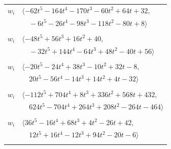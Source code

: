 \documentclass[11pt]{article}
\begin{document}
\begin{longtable}{@{}ll@{}}
$w_i$ & $\langle -62t^{5}-164t^{4}-170t^{3}-60t^{2}+64t+32,$\\
 & $\quad -6t^{5}-26t^{4}-98t^{3}-118t^{2}-80t+8\rangle$\\
\addlinespace[2pt]
\multicolumn{2}{@{}p{0.97\textwidth}@{}}{$i=32$, $D_i=2$, $\rho_{ij}$: $3{:}1, \allowbreak 7{:}1, \allowbreak 16{:}2, \allowbreak 25{:}3, \allowbreak 26{:}1, \allowbreak 30{:}2, \allowbreak 41{:}2, \allowbreak 43{:}1, \allowbreak 47{:}1, \allowbreak 53{:}1, \allowbreak 54{:}3, \allowbreak 56{:}3$}\\
$w_i$ & $\langle -48t^{5}+56t^{3}+16t^{2}+40,$\\
 & $\quad -32t^{5}+144t^{4}-64t^{3}+48t^{2}-40t+56\rangle$\\
\addlinespace[2pt]
\multicolumn{2}{@{}p{0.97\textwidth}@{}}{$i=33$, $D_i=1$, $\rho_{ij}$: $11{:}3, \allowbreak 20{:}1, \allowbreak 23{:}2, \allowbreak 31{:}3, \allowbreak 44{:}3, \allowbreak 45{:}3, \allowbreak 49{:}3, \allowbreak 50{:}1$}\\
$w_i$ & $\langle -20t^{5}-24t^{4}+38t^{3}-10t^{2}+32t-8,$\\
 & $\quad 20t^{5}-56t^{4}-14t^{3}+14t^{2}+4t-32\rangle$\\
\addlinespace[2pt]
\multicolumn{2}{@{}p{0.97\textwidth}@{}}{$i=34$, $D_i=1$, $\rho_{ij}$: $0{:}3, \allowbreak 13{:}2, \allowbreak 17{:}2, \allowbreak 23{:}2, \allowbreak 27{:}3, \allowbreak 28{:}3, \allowbreak 35{:}3, \allowbreak 36{:}2, \allowbreak 41{:}1, \allowbreak 42{:}3, \allowbreak 46{:}2, \allowbreak 47{:}2, \allowbreak 49{:}2, \allowbreak 51{:}3$}\\
$w_i$ & $\langle -112t^{5}+704t^{4}+8t^{3}+336t^{2}+568t+432,$\\
 & $\quad 624t^{5}-704t^{4}+264t^{3}+208t^{2}-264t-464\rangle$\\
\addlinespace[2pt]
\multicolumn{2}{@{}p{0.97\textwidth}@{}}{$i=35$, $D_i=1$, $\rho_{ij}$: $3{:}2, \allowbreak 4{:}1, \allowbreak 5{:}1, \allowbreak 15{:}1, \allowbreak 23{:}2, \allowbreak 24{:}2, \allowbreak 28{:}1, \allowbreak 34{:}1, \allowbreak 42{:}3, \allowbreak 44{:}3, \allowbreak 45{:}2, \allowbreak 49{:}2, \allowbreak 50{:}2, \allowbreak 52{:}2$}\\
$w_i$ & $\langle 36t^{5}-16t^{4}+68t^{3}+4t^{2}-26t+42,$\\
 & $\quad 12t^{5}+16t^{4}-12t^{3}+94t^{2}-20t-6\rangle$\\
\addlinespace[2pt]
\multicolumn{2}{@{}p{0.97\textwidth}@{}}{$i=36$, $D_i=2$, $\rho_{ij}$: $2{:}2, \allowbreak 5{:}2, \allowbreak 9{:}3, \allowbreak 14{:}3, \allowbreak 27{:}3, \allowbreak 30{:}3, \allowbreak 34{:}2, \allowbreak 40{:}2, \allowbreak 55{:}3, \allowbreak 56{:}3$}\\

\end{longtable}
\end{document}
